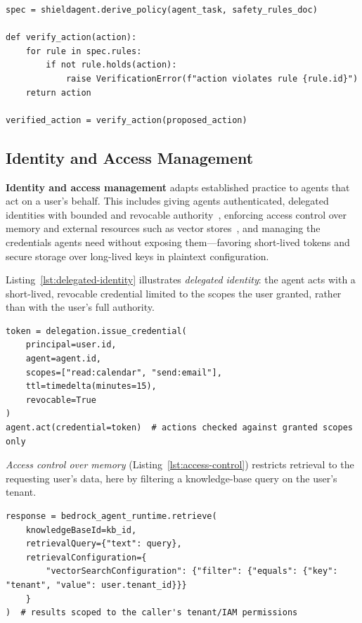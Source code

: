 \begin{lstlisting}[caption={Formal verification: checking proposed agent actions against safety specifications, in the style of ShieldAgent~\cite{chen2025shieldagent}.}, label={lst:formal-verification}]
spec = shieldagent.derive_policy(agent_task, safety_rules_doc)

def verify_action(action):
    for rule in spec.rules:
        if not rule.holds(action):
            raise VerificationError(f"action violates rule {rule.id}")
    return action

verified_action = verify_action(proposed_action)
\end{lstlisting}


\subsection{Identity and Access Management}

\textbf{Identity and access management} adapts established practice to agents that act on a user's behalf. This includes giving agents authenticated, delegated identities with bounded and revocable authority~\cite{south2025delegation}, enforcing access control over memory and external resources such as vector stores~\cite{bedrock}, and managing the credentials agents need without exposing them—favoring short-lived tokens and secure storage over long-lived keys in plaintext configuration.

Listing~\ref{lst:delegated-identity} illustrates \emph{delegated identity}: the agent acts with a short-lived, revocable credential limited to the scopes the user granted, rather than with the user's full authority.

\begin{lstlisting}[caption={Delegated identity: bounded, revocable authority granted to an agent acting on a user's behalf~\cite{south2025delegation}.}, label={lst:delegated-identity}]
token = delegation.issue_credential(
    principal=user.id,
    agent=agent.id,
    scopes=["read:calendar", "send:email"],
    ttl=timedelta(minutes=15),
    revocable=True
)
agent.act(credential=token)  # actions checked against granted scopes only
\end{lstlisting}

\emph{Access control over memory} (Listing~\ref{lst:access-control}) restricts retrieval to the requesting user's data, here by filtering a knowledge-base query on the user's tenant.

\begin{lstlisting}[caption={Access control over memory and external resources, as implemented for agent knowledge bases in Amazon Bedrock~\cite{bedrock}.}, label={lst:access-control}]
response = bedrock_agent_runtime.retrieve(
    knowledgeBaseId=kb_id,
    retrievalQuery={"text": query},
    retrievalConfiguration={
        "vectorSearchConfiguration": {"filter": {"equals": {"key": "tenant", "value": user.tenant_id}}}
    }
)  # results scoped to the caller's tenant/IAM permissions
\end{lstlisting}



